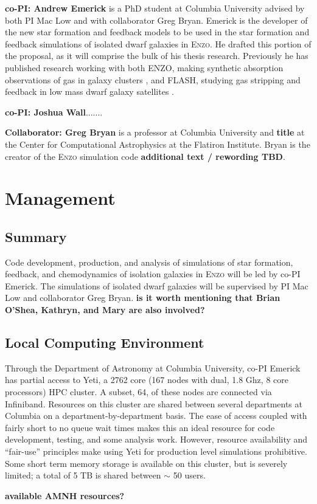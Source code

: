 \documentclass[11pt]{article}
\begin{document}
\textbf{co-PI: Andrew Emerick} is a PhD student at Columbia University advised by both PI Mac Low and with collaborator Greg Bryan. Emerick is the developer of the new star formation and feedback models to be used in the star formation and feedback simulations of isolated dwarf galaxies in \textsc{Enzo}. He drafted this portion of the proposal, as it will comprise the bulk of his thesis research. Previously he has published research working with both \textsc{ENZO}, making synthetic absorption observations of gas in galaxy clusters \citep{Emerick2015}, and \textsc{FLASH}, studying gas stripping and feedback in low mass dwarf galaxy satellites \citep{Emerick2016}.

\textbf{co-PI: Joshua Wall}.......

\textbf{Collaborator: Greg Bryan} is a professor at Columbia University and {\bf title} at the Center for Computational Astrophysics at the Flatiron Institute. Bryan is the creator of the \textsc{Enzo} simulation code {\bf additional text / rewording TBD}.

\section{Management}

\subsection{Summary}

Code development, production, and analysis of simulations of star formation, feedback, and chemodynamics of isolation galaxies in \textsc{Enzo} will be led by co-PI Emerick. The simulations of isolated dwarf galaxies will be supervised by PI Mac Low and collaborator Greg Bryan. {\bf is it worth mentioning that Brian O'Shea, Kathryn, and Mary are also involved?}

\subsection{Local Computing Environment}

Through the Department of Astronomy at Columbia University, co-PI Emerick has partial access to Yeti, a 2762 core (167 nodes with dual, 1.8 Ghz, 8 core processors) HPC cluster. A subset, 64, of these nodes are connected via Infiniband. Resources on this cluster are shared between several departments at Columbia on a department-by-department basis. The ease of access coupled with fairly short to no queue wait times makes this an ideal resource for code development, testing, and some analysis work. However, resource availability and ``fair-use'' principles make using Yeti for production level simulations prohibitive. Some short term memory storage is available on this cluster, but is severely limited; a total of 5 TB is shared between $\sim$ 50 users.

{\bf available AMNH resources?}




\end{document}
